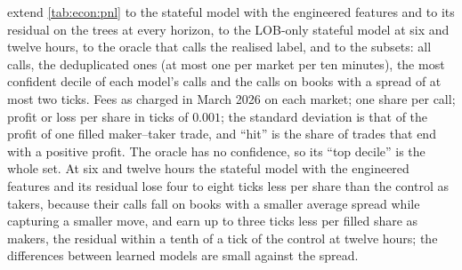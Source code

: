 extend \cref{tab:econ:pnl} to the stateful model with the engineered
features and to its residual on the trees at every horizon, to the LOB-only stateful model
at six and twelve hours, to the oracle that calls the realised label, and to the subsets: all
calls, the deduplicated ones (at most one per market per ten minutes), the most confident
decile of each model's calls and the calls on books with a spread of at most two ticks.  Fees
as charged in March 2026 on each market; one share per call; profit or loss per share in
ticks of $0.001$; the standard deviation is that of the profit of one filled maker--taker
trade, and ``hit'' is the share of trades that end with a positive profit.  The oracle has
no confidence, so its ``top decile'' is the whole set.
At six and twelve hours the stateful model with the engineered features and its residual
lose four to eight ticks less per share than the control as takers, because their calls fall
on books with a smaller average spread while capturing a smaller move, and earn up to three
ticks less per filled share as makers, the residual within a tenth of a tick of the control
at twelve hours; the differences between learned models are small against the spread.

